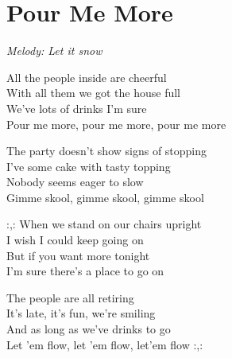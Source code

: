 \section{Pour Me More}

\textit{Melody: Let it snow}

All the people inside are cheerful\\
With all them we got the house full\\
We've lots of drinks I'm sure\\
Pour me more, pour me more, pour me more


The party doesn't show signs of stopping\\
I've some cake with tasty topping\\
Nobody seems eager to slow\\
Gimme skool, gimme skool, gimme skool


:,: When we stand on our chairs upright\\
I wish I could keep going on\\
But if you want more tonight\\
I'm sure there's a place to go on


The people are all retiring\\
It's late, it's fun, we're smiling\\
And as long as we've drinks to go\\
Let 'em flow, let 'em flow, let'em flow :,: